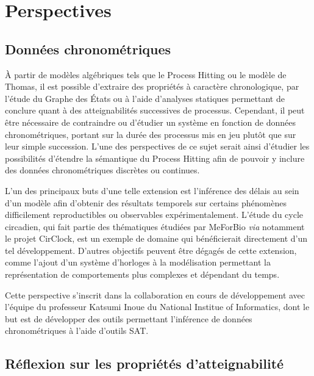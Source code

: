 \chapter{Perspectives}

\section{Données chronométriques}
À partir de modèles algébriques tels que le Process Hitting ou le modèle de Thomas, il est possible d'extraire des propriétés à caractère chronologique,
par l'étude du Graphe des États ou à l'aide d'analyses statiques permettant de conclure quant à des atteignabilités successives de processus.
Cependant, il peut être nécessaire de contraindre ou d'étudier un système en fonction de données chronométriques, portant sur la durée des processus mis en jeu plutôt que sur leur simple succession.
L'une des perspectives de ce sujet serait ainsi d'étudier les possibilités d'étendre la sémantique du Process Hitting afin de pouvoir y inclure des données chronométriques discrètes ou continues.

L'un des principaux buts d'une telle extension est l'inférence des délais au sein d'un modèle afin d'obtenir des résultats temporels sur certains phénomènes difficilement reproductibles ou observables expérimentalement.
L'étude du cycle circadien, qui fait partie des thématiques étudiées par MeForBio \textit{via} notamment le projet CirClock, est un exemple de domaine qui bénéficierait directement d'un tel développement.
D'autres objectifs peuvent être dégagés de cette extension, comme l'ajout d'un système d'horloges à la modélisation permettant la représentation de comportements plus complexes et dépendant du temps.

Cette perspective s'inscrit dans la collaboration en cours de développement avec l'équipe du professeur Katsumi Inoue du National Institue of Informatics,
dont le but est de développer des outils permettant l'inférence de données chronométriques à l'aide d'outils SAT.




\section{Réflexion sur les propriétés d'atteignabilité}


